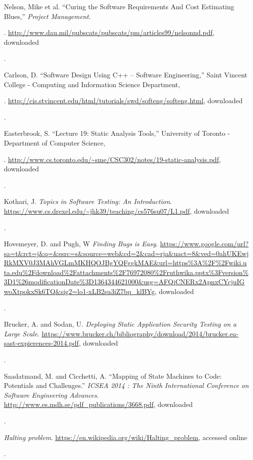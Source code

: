 \documentclass[12pt]{extarticle}
\begin{document}
\begin{thebibliography}{9}

	Nelson, Mike et al.
	``Curing the Software Requirements And Cost Estimating Blues,'' 
	\textit{Project Management}.
	\date{November-December 1999}.
	\url{http://www.dau.mil/pubscats/pubscats/pm/articles99/nelsonnd.pdf},
	downloaded
	\date{11 April 2016}.


	Carlson, D.
	``Software Design Using C++ -- Software Engineering,'' Saint Vincent College - Computing and Information Science Department,
	\date{31 January 2016}.
	\url{http://cis.stvincent.edu/html/tutorials/swd/softeng/softeng.html},
	downloaded
	\date{11 April 2016}.


	Easterbrook, S.
	``Lecture 19: Static Analysis Tools,'' University of Toronto - Department of Computer Science,
	\date{2012}.
	\url{http://www.cs.toronto.edu/~sme/CSC302/notes/19-static-analysis.pdf},
	downloaded
	\date{17 April 2016}.


	Kothari, J.
	\textit{Topics in Software Testing: An Introduction}.
	\url{https://www.cs.drexel.edu/~jhk39/teaching/cs576su07/L1.pdf}, downloaded
	\date{11 April 2016}.


	Hovemeyer, D. and Pugh, W
	\textit{Finding Bugs is Easy}.
	\url{https://www.google.com/url?sa=t&rct=j&q=&esrc=s&source=web&cd=2&cad=rja&uact=8&ved=0ahUKEwjRkMXV0J3MAhVGLmMKHQOJBgYQFggkMAE&url=https%3A%2F%2Fwiki.uta.edu%2Fdownload%2Fattachments%2F76972080%2Fruthwika.pptx%3Fversion%3D1%26modificationDate%3D1364344621000&usg=AFQjCNERx2ApnxCYcjuIGwoXtpokxSk6TQ&sig2=lo1-xLB2su3iZ7bq_klBYg}, downloaded
	\date{17 April 2016}.

	Brucker, A. and Sodan, U.
	\textit{Deploying Static Application Security Testing
	on a Large Scale}.
	\url{https://www.brucker.ch/bibliography/download/2014/brucker.ea-sast-expierences-2014.pdf}, downloaded
	\date{17 April 2016}.


	Saadatmand, M. and Cicchetti, A.
	``Mapping of State Machines to Code: Potentials and Challenges.''
	\textit{ICSEA 2014 : The Ninth International Conference on Software Engineering Advances}.
	\url{http://www.es.mdh.se/pdf_publications/3668.pdf}, downloaded
	\date{17 April 2016}.

	\textit{Halting problem}.
	\url{https://en.wikipedia.org/wiki/Halting_problem}, accessed online
	\date{11 April 2016}.


\end{thebibliography}
\end{document}
